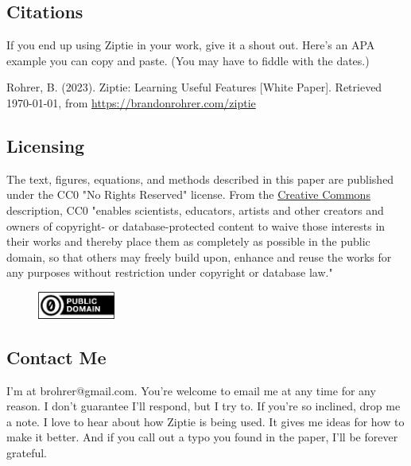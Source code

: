 \subsection{Citations}
\label{subsec:citations}

If you end up using Ziptie in your work, give it a shout out.
Here's an APA example you can copy and paste. (You may have to fiddle with
the dates.)

Rohrer, B. (2023). Ziptie: Learning Useful Features [White Paper].
Retrieved \today, from
\href{https://brandonrohrer.com/ziptie}{https://brandonrohrer.com/ziptie}


\subsection{Licensing}
\label{subsec:license}

The text, figures, equations, and methods described in this paper
are published under the CC0 "No Rights Reserved" license.
From the
\href{https://creativecommons.org/public-domain/cc0/}{Creative Commons} description,
CC0 "enables scientists, educators,
artists and other creators and owners of copyright- or database-protected
content to waive those interests in their works and thereby place them as
completely as possible in the public domain, so that others may freely
build upon, enhance and reuse the works for any purposes without restriction
under copyright or database law."

\begin{figure}[ht]
\vskip 0.2in
\begin{center}
\centerline{\includegraphics[width=1.0in]{images/cc-zero.png}}
\label{fig:cc0}
\end{center}
\vskip -0.2in
\end{figure}

\subsection{Contact Me}
\label{subsec:contact}

I'm at brohrer@gmail.com. You're welcome to email me at any time for
any reason. I don't guarantee I'll respond, but I try to.
If you're so inclined, drop me a note.
I love to hear about how
Ziptie is being used. It gives me ideas for how to make it better.
And if you call out a typo you found in the paper, I'll be forever grateful.
